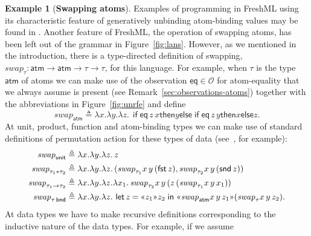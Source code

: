 \documentclass{LMCS}
\theoremstyle{plain}
\theoremstyle{definition}
\newtheorem{example}[thm]{Example}
\newcommand{\ATM}{\kw{atm}}
\newcommand{\BINDTY}{\kw{bnd}}
\newcommand{\BINDVAL}[2]{\mathopen{\text{\normalfont\guillemotleft}}#1
  \mathclose{\text{\normalfont\guillemotright}}#2}
\newcommand{\defeq}{\triangleq}
\newcommand{\ELSE}{\mathrel{\kw{else}}}
\newcommand{\EQ}{\mathbin{\kw{=}}}
\newcommand{\FST}{\kw{fst}}
\newcommand{\FUNTY}{\mathbin{\rightarrow}}
\newcommand{\IF}{\mathop{\kw{if}}}
\newcommand{\IN}{\mathrel{\kw{in}}}
\newcommand{\LET}{\mathop{\kw{let}}}
\newcommand{\kw}[1]{\mathsf{#1}}
\newcommand{\Obs}{\mathcal{O}}
\newcommand{\OBS}[1][obs]{\kw{#1}}
\newcommand{\OFTY}{\mathrel{\kw{:}}}
\newcommand{\PRODTY}{\mathbin{\kw{*}}}
\newcommand{\THEN}{\mathrel{\kw{then}}}
\newcommand{\ty}{\tau}
\newcommand{\UNIT}{\kw{unit}}
\newcommand{\vid}[1][x]{#1}
\begin{document}
\begin{example}[\textbf{Swapping atoms}]
  \label{exa:swa}
  Examples of programming in FreshML using its characteristic feature
  of generatively unbinding atom-binding values may be found in
  \cite{PittsAM:frepbm,PittsAM:freocu}. Another feature of FreshML,
  the operation of swapping atoms, has been left out of the grammar in
  Figure~\ref{fig:lans}. However, as we mentioned in the introduction,
  there is a type-directed definition of swapping,
  $\mathit{swap}_{\ty}\OFTY\ATM\FUNTY\ATM\FUNTY\ty\FUNTY\ty$, for this
  language. For example, when $\ty$ is the type $\ATM$ of atoms we can
  make use of the observation $\OBS[eq]\in\Obs$ for atom-equality that
  we always assume is present (see
  Remark~\ref{sec:observations-atoms}) together with the
  abbreviations in Figure~\ref{fig:unrfe} and define
  \begin{equation}
    \label{eq:82}
    \mathit{swap}_{\ATM} \defeq \lambda \vid.\lambda \vid[y].
    \lambda \vid[z].\, \IF {\OBS[eq]\,\vid[z]\,\vid} \THEN \vid[y]
    \ELSE {\IF {\OBS[eq]\,\vid[z]\,\vid[y]} \THEN \vid
    \ELSE \vid[z]}.
  \end{equation}
  At unit, product, function and atom-binding types we can make use of
  standard definitions of permutation action for these types of data
  (see~\cite[Section~3]{PittsAM:alpsri}, for example):
  \begin{align}
    \label{eq:84}
    \mathit{swap}_{\UNIT} &\defeq \lambda \vid.\lambda \vid[y].
    \lambda \vid[z].\, \vid[z]\\
    \label{eq:85}
    \mathit{swap}_{\ty_1\PRODTY\ty_2} &\defeq \lambda \vid.\lambda
    \vid[y].\lambda
    \vid[z].\,(\mathit{swap}_{\ty_1}\vid\,\vid[y]\,(\FST\,\vid[z]),
    \mathit{swap}_{\ty_2}\vid\,\vid[y]\,(\SND\,\vid[z]))\\
    \label{eq:71}
    \mathit{swap}_{\ty_1\FUNTY\ty_2} &\defeq \lambda \vid.\lambda
    \vid[y].\lambda \vid[z].\lambda \vid_1.\,
    \mathit{swap}_{\ty_2}\vid\,\vid[y]\,(\vid[z]\,
    (\mathit{swap}_{\ty_1}\vid\,\vid[y]\,\vid_1))\\
    \label{eq:73}
    \mathit{swap}_{\ty\,\BINDTY} &\defeq \lambda \vid.\lambda
    \vid[y].\lambda \vid[z].\,\LET
    {\vid[z]\EQ\BINDVAL{\vid[z]_1}{\vid[z]_2}} \IN
    \BINDVAL{\mathit{swap}_{\ATM}\vid\,\vid[y]\,\vid[z]_1}
    {(\mathit{swap}_{\ty}\vid\,\vid[y]\,\vid[z]_2)}.
  \end{align}
  At data types we have to make recursive definitions corresponding to
  the inductive nature of the data types. For example, if we assume

\end{example}
\end{document}
